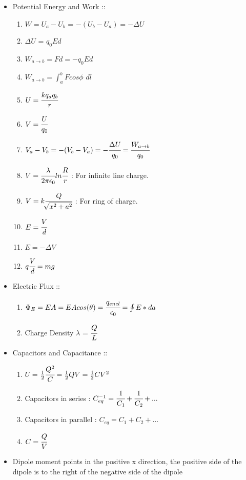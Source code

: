 \documentclass[12pt]{article}
\begin{document}
\begin{itemize}
	\item[] Potential Energy and Work :: 
	\begin{enumerate}
		\item[] $W = U_a - U_b$ = $-(U_b - U_a) = -\Delta U$
		\item[] $\Delta U$ = $q_0Ed$
		\item[] $W_{a \rightarrow b} = Fd = -q_0Ed$
		\item[] $W_{a \rightarrow b} = \int_a^b Fcos\phi$ $dl$
		\item[] $U = \cfrac{kq_aq_b}{r}$	
		\item[] $V = \cfrac{U}{q_0}$
		\item[] $V_a - V_b = -(V_b - V_a) = -\cfrac{\Delta U}{q_0} = \cfrac{W_{a \rightarrow b}}{q_0}$
		\item[] $V = \cfrac{\lambda}{2\pi \epsilon_0}ln\cfrac{R}{r}$ : For infinite line charge.
		\item[] $V = k\cfrac{Q}{\sqrt[]{x^2 + a^2}}$ : For ring of charge.
		\item[] $E = \cfrac{V}{d}$
		\item[] $E = -\Delta V$
		\item[] $q\cfrac{V}{d} = mg$ \\
	\end{enumerate}
	\item[] Electric Flux :: 
	\begin{enumerate}
		\item[] $\Phi_E = EA = EAcos(\theta) = \cfrac{q_{encl}}{\epsilon_0} = \oint E*da$
		\item[] Charge Density $\lambda$ = $\cfrac{Q}{L}$\\
	\end{enumerate}
	\item[] Capacitors and Capacitance :: 
	\begin{enumerate}
		\item[] $U$ = $\frac{1}{2}\cfrac{Q^2}{C} = \frac{1}{2}QV = \frac{1}{2}CV^2$
		\item[] Capacitors in series : $C_{eq}^{-1} = \cfrac{1}{C_1} + \cfrac{1}{C_2} + ...$
		\item[] Capacitors in parallel : $C_{eq} = C_1 + C_2 + ...$
		\item[] $C = \cfrac{Q}{V}$
		\end{enumerate}
	\item Dipole moment points in the positive x direction, the positive side of the dipole is to the right of the negative side of the dipole
	
\end{itemize}
\end{document}
